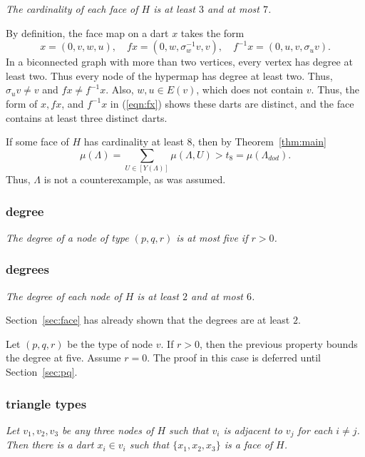 {\it The cardinality of each face of $H$ is at least $3$ and at most $7$.}


By  definition, the face map on a dart $x$ takes the form
\begin{equation}\label{eqn:fx}
x = (0,v,w,u),\quad
f x = (0,w,\sigma_w^{-1}v,v),\quad
f^{-1} x = (0,u,v,\sigma_u v).
\end{equation}
In a biconnected graph with more than two vertices,
every vertex has degree at least two.
Thus every node of the hypermap has degree
at least two.  Thus, $\sigma_u v\ne v$ and $f x\ne f^{-1} x$.
Also, $w,u\in E(v)$, which does not contain $v$.  Thus, 
the form of $x,fx$, and 
$f^{-1} x$
in (\ref{eqn:fx}) shows these darts are distinct, and
the
face contains at least three distinct darts.

If some face of $H$ has cardinality at least $8$, then by Theorem~\ref{thm:main}
$$
\mu(\Lambda) =\sum_{U\in [Y(\Lambda)]}\mu(\Lambda,U) > t_8 =\mu(\Lambda_{dod}).
$$
Thus, $\Lambda$ is not a counterexample, as was assumed.

\subsubsection{degree}

{\it The degree of a node of type $(p,q,r)$ is at most five if $r>0$.}


\subsubsection{degrees}\label{sec:degrees}

{\it The degree of each node of $H$ is at least $2$ and at most $6$.}


Section~\ref{sec:face} has already shown that the degrees are at least $2$.

Let $(p,q,r)$ be the type of node $v$.  If $r>0$, then the previous
property bounds the degree at five.  Assume $r=0$.  The
proof in this case is deferred until Section~\ref{sec:pq}.

\subsubsection{triangle types}

{\it Let $v_1,v_2,v_3$ be any three nodes of $H$ such that $v_i$ is adjacent to $v_j$
for each $i\ne j$.  Then there is a dart $x_i\in v_i$ such that $\{x_1,x_2,x_3\}$ is
a face of $H$.}

